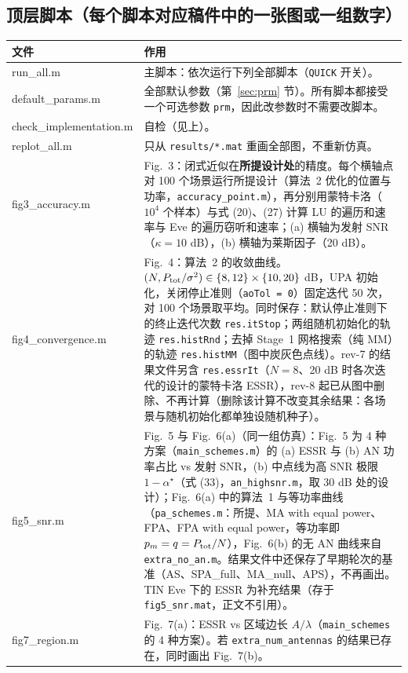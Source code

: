 \documentclass[11pt,a4paper]{ctexart}
\newcommand{\code}[1]{\texttt{#1}}
\newcommand{\Ptot}{P_{\rm tot}}
\begin{document}
\subsection{顶层脚本（每个脚本对应稿件中的一张图或一组数字）}
\begin{longtable}{>{\ttfamily\small}p{4.6cm}p{11.2cm}}
\toprule
文件 & 作用 \\ \midrule
run\_all.m & 主脚本：依次运行下列全部脚本（\code{QUICK} 开关）。\\
default\_params.m & 全部默认参数（第~\ref{sec:prm} 节）。所有脚本都接受一个可选参数 \code{prm}，因此改参数时不需要改脚本。\\
check\_implementation.m & 自检（见上）。\\
replot\_all.m & 只从 \code{results/*.mat} 重画全部图，不重新仿真。\\ \midrule
fig3\_accuracy.m & Fig.~3：闭式近似在\textbf{所提设计处}的精度。每个横轴点对 100 个场景运行所提设计（算法~2 优化的位置与功率，\code{accuracy\_point.m}），再分别用蒙特卡洛（$10^4$ 个样本）与式 (20)、(27) 计算 LU 的遍历和速率与 Eve 的遍历窃听和速率；(a) 横轴为发射 SNR（$\kappa=10$ dB），(b) 横轴为莱斯因子（20 dB）。\\
fig4\_convergence.m & Fig.~4：算法~2 的收敛曲线。$(N,\Ptot/\sigma^2)\in\{8,12\}\times\{10,20\}$ dB，UPA 初始化，关闭停止准则（\code{aoTol = 0}）固定迭代 50 次，对 100 个场景取平均。同时保存：默认停止准则下的终止迭代次数 \code{res.itStop}；两组随机初始化的轨迹 \code{res.histRnd}；去掉 Stage~1 网格搜索（纯 MM）的轨迹 \code{res.histMM}（图中炭灰色点线）。rev-7 的结果文件另含 \code{res.essrIt}（$N=8$、20 dB 时各次迭代的设计的蒙特卡洛 ESSR），rev-8 起已从图中删除、不再计算（删除该计算不改变其余结果：各场景与随机初始化都单独设随机种子）。\\
fig5\_snr.m & Fig.~5 与 Fig.~6(a)（同一组仿真）：Fig.~5 为 4 种方案（\code{main\_schemes.m}）的 (a) ESSR 与 (b) AN 功率占比 vs 发射 SNR，(b) 中点线为高 SNR 极限 $1-\alpha^\star$（式 (33)，\code{an\_highsnr.m}，取 30 dB 处的设计）；Fig.~6(a) 中的算法~1 与等功率曲线（\code{pa\_schemes.m}：所提、MA with equal power、FPA、FPA with equal power，等功率即 $p_m=q=\Ptot/N$），Fig.~6(b) 的无 AN 曲线来自 \code{extra\_no\_an.m}。结果文件中还保存了早期轮次的基准（AS、SPA\_full、MA\_null、APS），不再画出。TIN Eve 下的 ESSR 为补充结果（存于 \code{fig5\_snr.mat}，正文不引用）。\\
fig7\_region.m & Fig.~7(a)：ESSR vs 区域边长 $A/\lambda$（\code{main\_schemes} 的 4 种方案）。若 \code{extra\_num\_antennas} 的结果已存在，同时画出 Fig.~7(b)。\\

\end{longtable}
\end{document}
